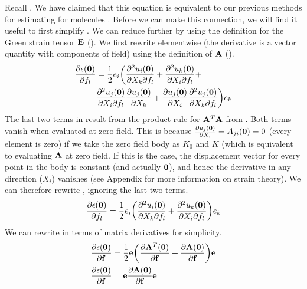 Recall .  
We have claimed that this equation is equivalent to our previous methods for estimating \dtt for molecules \cite{Werling0}. 
Before we can make this connection, we will find it useful to first simplify .  
We can reduce  further by using the definition for the Green strain tensor ${\mathbf E}$ (). 
We first rewrite  elementwise (the derivative is a vector quantity with components of field) using the definition of ${\mathbf A}$ ().
\begin{equation}
\begin{split}
\label{eq:element}
\frac{\partial \epsilon ({\bf{0}})}{\partial f_l}&= \frac{1}{2}e_i \bigg(\frac{\partial^2 u_i({\mathbf 0})}{\partial X_k\partial f_l} + \frac{\partial^2 u_k({\mathbf 0})}{\partial X_i \partial f_l} + \\
 &\frac{\partial^2 u_j({\mathbf 0})}{\partial X_i \partial f_l}\frac{\partial u_j({\mathbf 0})}{\partial X_k} + \frac{\partial u_j({\mathbf 0})}{\partial X_i}\frac{\partial^2 u_j({\mathbf 0})}{\partial X_k \partial f_l}\bigg)e_k
 \end{split}
\end{equation}
The last two terms in  result from the product rule for ${\mathbf A}^T{\mathbf A}$ from .  
Both terms vanish when evaluated at zero field.  
This is because $\frac{\partial u_j({\mathbf 0})}{\partial X_i}=A_{ji}({\mathbf 0})=0$ (every element is zero) if
we take the zero field body as $K_0$ and $K$ (which is equivalent to evaluating ${\mathbf A}$ at zero field. 
If this is the case, the displacement vector for every point in the body is constant (and actually ${\mathbf 0}$), and hence 
the derivative in any direction ($X_i$) vanishes (see Appendix for more information on strain theory).  
We can therefore rewrite , ignoring the last two terms.  
\begin{equation}
\label{eq:element2}
\frac{\partial \epsilon ({\bf{0}})}{\partial f_l}= \frac{1}{2}e_i \bigg(\frac{\partial^2 u_i({\mathbf 0})}{\partial X_k\partial f_l} + \frac{\partial^2 u_k({\mathbf 0})}{\partial X_i \partial f_l} \bigg)e_k
\end{equation}
We can rewrite  in terms of matrix derivatives for simplicity.  
\begin{equation}
\begin{split}
\label{eq:nonelement}
\frac{\partial \epsilon ({\bf{0}})}{\partial {\mathbf f}}&= \frac{1}{2}{\mathbf e} \bigg(\frac{\partial {\mathbf A}^T({\mathbf 0})}{\partial {\mathbf f}} + \frac{\partial {\mathbf A}({\mathbf 0})}{\partial {\mathbf f}} \bigg){\mathbf e} \\
\frac{\partial \epsilon ({\bf{0}})}{\partial {\mathbf f}}&= {\mathbf e}\frac{\partial {\mathbf A}({\mathbf 0})}{\partial {\mathbf f}}{\mathbf e}
\end{split}
\end{equation}
